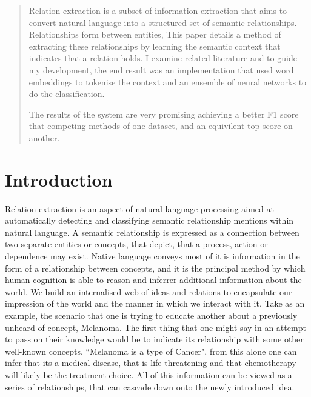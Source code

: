 \documentclass[12pt]{article} %
\begin{document}
\begin{titlepage}
\begin{abstract}
\noindent Relation extraction is a subset of information extraction that aims to convert natural language into a structured set of semantic relationships. Relationships form between entities, This paper details a method of extracting these relationships by learning the semantic context that indicates that a relation holds. I examine related literature and to guide my development, the end result was an implementation that used word embeddings to tokenise the context and an ensemble of neural networks to do the classification.

The results of the system are very promising achieving a better F1 score that competing methods of one dataset, and an equivilent top score on another. 
\end{abstract}


\vfill %
\end{titlepage}



\pagestyle{empty}
\tableofcontents %
\newpage %

\pagestyle{plain}
\setcounter{page}{1}


\section{Introduction}

Relation extraction is an aspect of natural language processing aimed at automatically detecting and classifying semantic relationship mentions within natural language. A semantic relationship is expressed as a connection between two separate entities or concepts, that depict, that a process, action or dependence may exist. Native language conveys most of it is information in the form of a  relationship between concepts, and it is the principal method by which human cognition is able to reason and inferrer additional information about the world. We build an internalised web of ideas and relations to encapsulate our impression of the world and the manner in which we interact with it. Take as an example, the scenario that one is trying to educate another about a previously unheard of concept, Melanoma. The first thing that one might say in an attempt to pass on their knowledge would be to indicate its relationship with some other well-known concepts. ``Melanoma is a type of Cancer", from this alone one can infer that its a medical disease, that is life-threatening and that chemotherapy will likely be the treatment choice. All of this information can be viewed as a series of relationships, that can cascade down onto the newly introduced idea.\\
\end{document}
